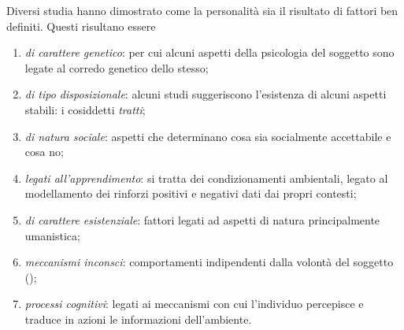 \documentclass{subfiles}
\begin{document}
Diversi studia hanno dimostrato come la personalità sia il risultato di fattori ben definiti.
Questi risultano essere
\begin{enumerate}
    \item \emph{di carattere genetico}: per cui alcuni aspetti della psicologia del soggetto sono legate al corredo genetico dello stesso;
    \item \emph{di tipo disposizionale}: alcuni studi suggeriscono l'esistenza di alcuni aspetti stabili: i cosiddetti \emph{tratti};
    \item \emph{di natura sociale}: aspetti che determinano cosa sia socialmente accettabile e cosa no;
    \item \emph{legati all'apprendimento}: si tratta dei condizionamenti ambientali, legato al modellamento dei rinforzi positivi e negativi dati dai propri contesti;
    \item \emph{di carattere esistenziale}: fattori legati ad aspetti di natura principalmente umanistica;
    \item \emph{meccanismi inconsci}: comportamenti indipendenti dalla volontà del soggetto ();
    \item \emph{processi cognitivi}: legati ai meccanismi con cui l'individuo percepisce e traduce in azioni le informazioni dell'ambiente.
\end{enumerate}
\end{document}
